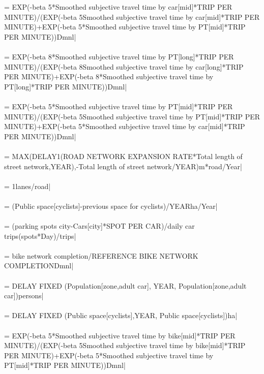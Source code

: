  = EXP(-beta 5*Smoothed subjective travel time by car[mid]*TRIP PER MINUTE)/(EXP(-beta 5\*Smoothed subjective travel time by car[mid]*TRIP PER MINUTE)+EXP(-beta 5*Smoothed subjective travel time by PT[mid]*TRIP PER MINUTE))Dmnl| \\ \\ 
 = EXP(-beta 8*Smoothed subjective travel time by PT[long]*TRIP PER MINUTE)/(EXP(-beta 8\*Smoothed subjective travel time by car[long]*TRIP PER MINUTE)+EXP(-beta 8*Smoothed subjective travel time by PT[long]*TRIP PER MINUTE))Dmnl| \\ \\ 
 = EXP(-beta 5*Smoothed subjective travel time by PT[mid]*TRIP PER MINUTE)/(EXP(-beta 5\*Smoothed subjective travel time by PT[mid]*TRIP PER MINUTE)+EXP(-beta 5*Smoothed subjective travel time by car[mid]*TRIP PER MINUTE))Dmnl| \\ \\ 
 = MAX(DELAY1(ROAD NETWORK EXPANSION RATE*Total length of street network,YEAR),-Total length of street network/YEAR)m*road/Year| \\ \\ 
 = 1lanes/road| \\ \\ 
 = (Public space[cyclists]-previous space for cyclists)/YEARha/Year| \\ \\ 
 = (parking spots city-Cars[city]*SPOT PER CAR)/daily car trips(spots*Day)/trips| \\ \\ 
 = bike network completion/REFERENCE BIKE NETWORK COMPLETIONDmnl| \\ \\ 
 =  DELAY FIXED (Population[zone,adult car], YEAR, Population[zone,adult car])persons| \\ \\ 
 =  DELAY FIXED (Public space[cyclists],YEAR, Public space[cyclists])ha| \\ \\ 
 = EXP(-beta 5*Smoothed subjective travel time by bike[mid]*TRIP PER MINUTE)/(EXP(-beta 5\*Smoothed subjective travel time by bike[mid]*TRIP PER MINUTE)+EXP(-beta 5*Smoothed subjective travel time by PT[mid]*TRIP PER MINUTE))Dmnl| \\ \\ 
